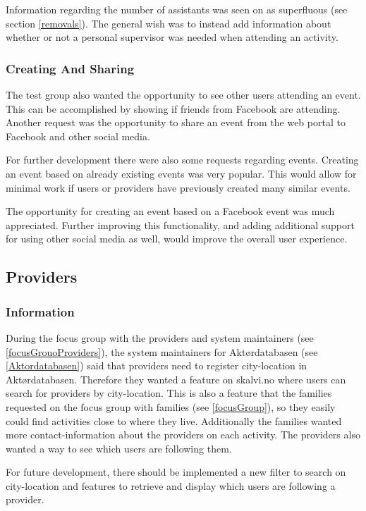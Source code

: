Information regarding the number of assistants was seen on as superfluous (see section \ref{removals}). The general wish was to instead add information about whether or not a personal supervisor was needed when attending an activity.

\subsubsection{Creating And Sharing}
The test group also wanted the opportunity to see other users attending an event. This can be accomplished by showing if friends from Facebook are attending. Another request was the opportunity to share an event from the web portal to Facebook and other social media.

For further development there were also some requests regarding events. Creating an event based on already existing events was very popular. This would allow for minimal work if users or providers have previously created many similar events. 

The opportunity for creating an event based on a Facebook event was much appreciated. Further improving this functionality, and adding additional support for using other social media as well, would improve the overall user experience.

\subsection{Providers}
\subsubsection{Information}
During the focus group with the providers and system maintainers (see \ref{focusGrouoProviders}), the system maintainers for Aktørdatabasen (see \ref{Aktordatabasen}) said that providers need to register city-location in Aktørdatabasen. Therefore they wanted a feature on skalvi.no where users can search for providers by city-location. This is also a feature that the families requested on the focus group with families (see \ref{focusGroup}), so they easily could find activities close to where they live. Additionally the families wanted more contact-information about the providers on each activity. The providers also wanted a way to see which users are following them.

For future development, there should be implemented a new filter to search on city-location and features to retrieve and display which users are following a provider.

